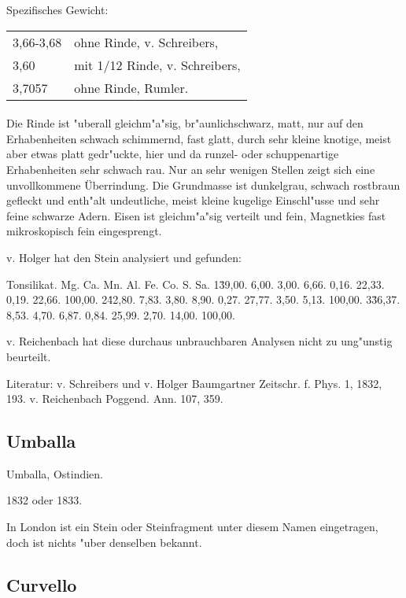 \documentclass[a4paper, 11pt, oneside]{article}
\begin{document}
Spezifisches Gewicht:  
\begin{table}[!ht]
    \centering
    \begin{tabular}{l l}
        3,66-3,68 & ohne Rinde, v. Schreibers,\\
        3,60 & mit 1/12 Rinde, v. Schreibers,\\
        3,7057 & ohne Rinde, Rumler.
    \end{tabular}
\end{table}
\paragraph{}
Die Rinde ist "uberall gleichm"a"sig, br"aunlichschwarz, matt, nur auf den Erhabenheiten schwach schimmernd, fast glatt, durch sehr kleine knotige, meist aber etwas platt gedr"uckte, hier und da runzel- oder schuppenartige Erhabenheiten sehr schwach rau. Nur an sehr wenigen Stellen zeigt sich eine unvollkommene Überrindung. Die Grundmasse ist dunkelgrau, schwach rostbraun gefleckt und enth"alt undeutliche, meist kleine kugelige Einschl"usse und sehr feine schwarze Adern. Eisen ist gleichm"a"sig verteilt und fein, Magnetkies fast mikroskopisch fein eingesprengt.

v. Holger hat den Stein analysiert und gefunden:

Tonsilikat. Mg. Ca. Mn. Al. Fe. Co. S. Sa.  
1\. 39,00. 6,00. 3,00. 6,66. 0,16. 22,33. 0,19. 22,66. 100,00.  
2\. 42,80. 7,83. 3,80. 8,90. 0,27. 27,77. 3,50. 5,13. 100,00.  
3\. 36,37. 8,53. 4,70. 6,87. 0,84. 25,99. 2,70. 14,00. 100,00.

v. Reichenbach hat diese durchaus unbrauchbaren Analysen nicht zu ung"unstig beurteilt.

Literatur: v. Schreibers und v. Holger Baumgartner Zeitschr. f. Phys. 1, 1832, 193. v. Reichenbach Poggend. Ann. 107, 359.

\subsection{Umballa}

Umballa, Ostindien.

1832 oder 1833.

In London ist ein Stein oder Steinfragment unter diesem Namen eingetragen, doch ist nichts "uber denselben bekannt.

\subsection{Curvello}
\end{document}
